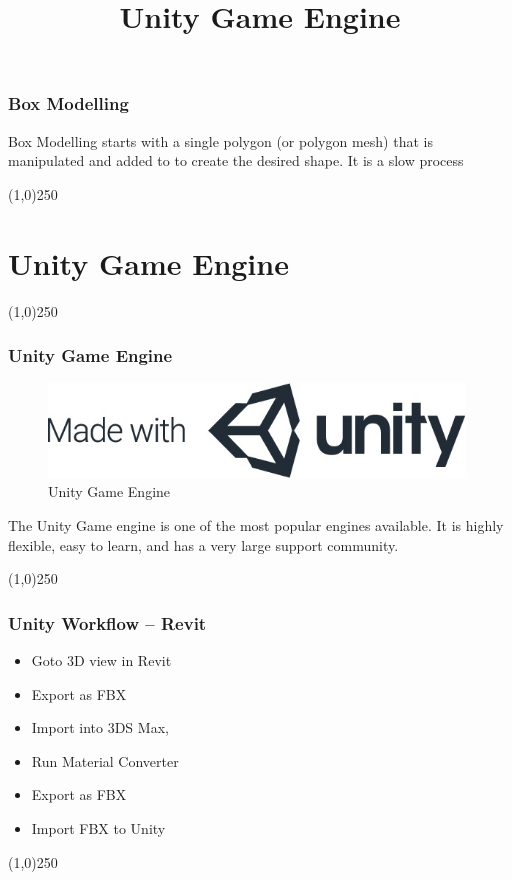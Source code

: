 \begin{frame}
\frametitle{Box Modelling}
Box Modelling starts with a single polygon (or polygon mesh) that is manipulated and added to to create the desired shape.  It is a slow process  

\end{frame}
\begin{center}\line(1,0){250}\end{center}








\section{Unity Game Engine}
\begin{frame}
\title[Modelling]{Unity Game Engine}
\titlepage
\end{frame}\begin{center}\line(1,0){250}\end{center}


\begin{frame}
\frametitle{Unity Game Engine}
\begin{figure}
	\centering
	\includegraphics[height=2.5cm]{./img/Unity/mwu-logo.jpg}
	\caption[Unity Game Engine]{Unity Game Engine}
	\label{fig:mwulogo}
\end{figure}
The Unity Game engine is one of the most popular engines available.  It is highly flexible, easy to learn, and has a very large support community.
\end{frame}
\begin{center}\line(1,0){250}\end{center}



\begin{frame}
\frametitle{Unity Workflow -- Revit}
\begin{itemize}
	\item Goto 3D view in Revit
	\item Export as FBX
	\item Import into 3DS Max,
	\item Run Material Converter
	\item Export as FBX
	\item Import FBX to Unity
\end{itemize}
\end{frame}
\begin{center}\line(1,0){250}\end{center}



